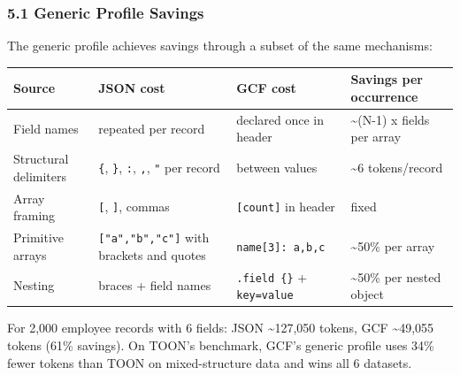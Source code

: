 \documentclass[
  11pt,
  paper=a4,
  ,captions=tableheading
]{scrartcl}
\newcounter{none} %
\begin{document}
\subsubsection{5.1 Generic Profile
Savings}\label{generic-profile-savings}

The generic profile achieves savings through a subset of the same
mechanisms:

{\def\LTcaptype{none} %
\begin{longtable}[]{@{}
  >{\raggedright\arraybackslash}p{}
  >{\raggedright\arraybackslash}p{}
  >{\raggedright\arraybackslash}p{}
  >{\raggedright\arraybackslash}p{}@{}}
\toprule\noalign{}
\begin{minipage}[b]{\linewidth}\raggedright
Source
\end{minipage} & \begin{minipage}[b]{\linewidth}\raggedright
JSON cost
\end{minipage} & \begin{minipage}[b]{\linewidth}\raggedright
GCF cost
\end{minipage} & \begin{minipage}[b]{\linewidth}\raggedright
Savings per occurrence
\end{minipage} \\
\midrule\noalign{}
\endhead
\bottomrule\noalign{}
\endlastfoot
Field names & repeated per record & declared once in header &
\textasciitilde(N-1) x fields per array \\
Structural delimiters & \texttt{\{}, \texttt{\}}, \texttt{:},
\texttt{,}, \texttt{"} per record & \texttt{\textbar{}} between values &
\textasciitilde6 tokens/record \\
Array framing & \texttt{{[}}, \texttt{{]}}, commas &
\texttt{{[}count{]}} in header & fixed \\
Primitive arrays & \texttt{{[}"a","b","c"{]}} with brackets and quotes &
\texttt{name{[}3{]}:\ a,b,c} & \textasciitilde50\% per array \\
Nesting & braces + field names & \texttt{.field\ \{\}} +
\texttt{key=value} & \textasciitilde50\% per nested object \\
\end{longtable}
}

For 2,000 employee records with 6 fields: JSON \textasciitilde127,050
tokens, GCF \textasciitilde49,055 tokens (61\% savings). On TOON's
benchmark, GCF's generic profile uses 34\% fewer tokens than TOON on
mixed-structure data and wins all 6 datasets.
\end{document}
